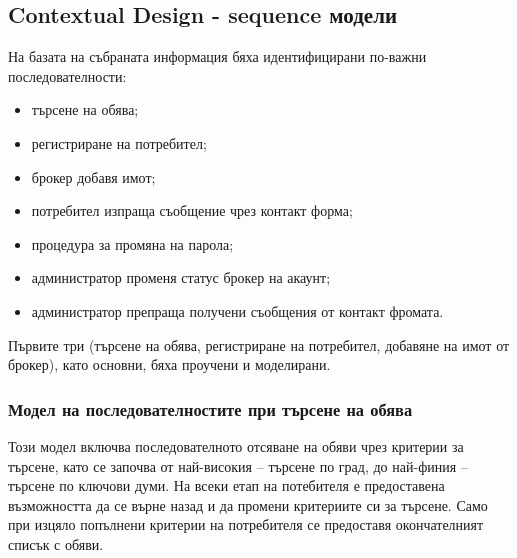 \documentclass[a4paper]{article}
\begin{document}
\clearpage

\subsection{Contextual Design - sequence модели}

На базата на събраната информация бяха идентифицирани по-важни последователности:
\begin{itemize}
	\item търсене на обява;
	\item регистриране на потребител;
	\item брокер добавя имот;
	\item потребител изпраща съобщение чрез контакт форма;
	\item процедура за промяна на парола;
	\item администратор променя статус брокер на акаунт;
	\item администратор препраща получени съобщения от контакт фромата.
\end{itemize}
Първите три (търсене на обява, регистриране на потребител, добавяне на имот от брокер), като основни, бяха проучени и моделирани.

\subsubsection{Модел на последователностите при търсене на обява}	
	
Този модел включва последователното отсяване на обяви чрез критерии за търсене, като се започва от най-високия -- търсене по град, до най-финия -- търсене по ключови думи. На всеки етап на потебителя е предоставена възможността да се върне назад и да промени критериите си за търсене. Само при изцяло попълнени критерии на потребителя се предоставя окончателният списък с обяви.
\end{document}
